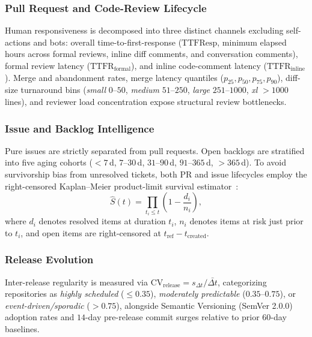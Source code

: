\documentclass[conference]{IEEEtran}
\begin{document}
\subsubsection{Pull Request and Code-Review Lifecycle}
Human responsiveness is decomposed into three distinct channels excluding self-actions and bots: overall time-to-first-response ($\text{TTFResp}$, minimum elapsed hours across formal reviews, inline diff comments, and conversation comments), formal review latency ($\text{TTFR}_{\text{formal}}$), and inline code-comment latency ($\text{TTFR}_{\text{inline}}$). Merge and abandonment rates, merge latency quantiles ($p_{25}, p_{50}, p_{75}, p_{90}$), diff-size turnaround bins (\emph{small} $0$--$50$, \emph{medium} $51$--$250$, \emph{large} $251$--$1000$, \emph{xl} $>1000$ lines), and reviewer load concentration expose structural review bottlenecks.

\subsubsection{Issue and Backlog Intelligence}
Pure issues are strictly separated from pull requests. Open backlogs are stratified into five aging cohorts ($<7$\,d, $7$--$30$\,d, $31$--$90$\,d, $91$--$365$\,d, $>365$\,d). To avoid survivorship bias from unresolved tickets, both PR and issue lifecycles employ the right-censored Kaplan--Meier product-limit survival estimator~\cite{kaplan1958nonparametric}:
\begin{equation}
    \hat{S}(t) = \prod_{t_i \le t} \left(1 - \frac{d_i}{n_i}\right),
\end{equation}
where $d_i$ denotes resolved items at duration $t_i$, $n_i$ denotes items at risk just prior to $t_i$, and open items are right-censored at $t_{\text{ref}} - t_{\text{created}}$.

\subsubsection{Release Evolution}
Inter-release regularity is measured via $\text{CV}_{\text{release}} = s_{\Delta t} / \bar{\Delta t}$, categorizing repositories as \emph{highly scheduled} ($\le 0.35$), \emph{moderately predictable} ($0.35$--$0.75$), or \emph{event-driven/sporadic} ($>0.75$), alongside Semantic Versioning (SemVer 2.0.0) adoption rates and $14$-day pre-release commit surges relative to prior $60$-day baselines.
\end{document}
